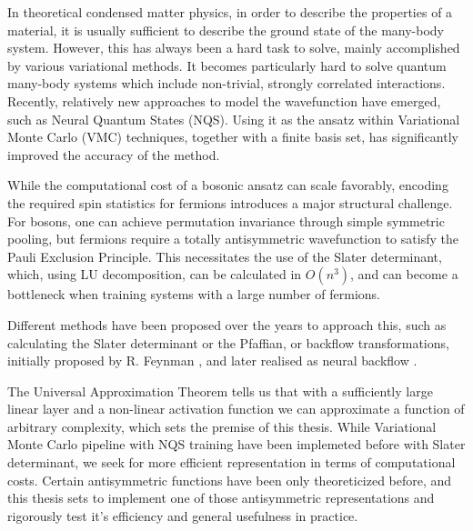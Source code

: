 \documentclass[a4paper,11pt,twoside]{article}
\begin{document}
In theoretical condensed matter physics, in order to describe the properties of a material, it is usually sufficient to describe the ground state of the many-body system. However, this has always been a hard task to solve, mainly accomplished by various variational methods. It becomes particularly hard to solve quantum many-body systems which include non-trivial, strongly correlated interactions.
Recently, relatively new approaches to model the wavefunction have emerged, such as Neural Quantum States (NQS)\cite{carleo_solving_2017}. Using it as the ansatz within Variational Monte Carlo (VMC) techniques, together with a finite basis set, has significantly improved the accuracy of the method.



While the computational cost of a bosonic ansatz can scale favorably, encoding the required spin statistics for fermions introduces a major structural challenge. For bosons, one can achieve permutation invariance through simple symmetric pooling, but fermions require a totally antisymmetric wavefunction to satisfy the Pauli Exclusion Principle. This necessitates the use of the Slater determinant, which, using LU decomposition, can be calculated in $O(n^3)$, and can become a bottleneck when training systems with a large number of fermions.

Different methods have been proposed over the years to approach this, such as calculating the Slater determinant or the Pfaffian, or backflow transformations, initially proposed by R. Feynman \cite{feynman_energy_nodate}, and later realised as neural backflow \cite{pfau_ab_2020}.

The Universal Approximation Theorem tells us that with a sufficiently large linear layer and a non-linear activation function we can approximate a function of arbitrary complexity, which sets the premise of this thesis. While Variational Monte Carlo pipeline with NQS training have been implemeted before with Slater determinant, we seek for more efficient representation in terms of computational costs. Certain antisymmetric functions have been only theoreticized before, and this thesis sets to implement one of those antisymmetric representations and rigorously test it's efficiency and general usefulness in practice. 



\newpage

\end{document}
